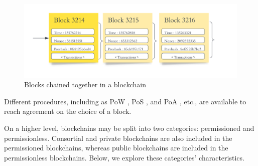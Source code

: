  \vspace{.5cm}
 
\begin{figure}[h]
  \includegraphics[width=\textwidth]{includes/figures/blocks.png}
  \caption{Blocks chained together in a blockchain}
  \label{Blocks chained together in a blockchain}
\end{figure}

 \vspace{.5cm}
 
Different procedures, including as \ac{PoW} \cite{pow}, \ac{PoS} \cite{pos}, and \ac{PoA} \cite{poa}, etc., are available to reach agreement on the choice of a block.
 
\vspace{.5cm}
 
On a higher level, blockchains may be split into two categories: permissioned and permissionless. Consortial and private blockchains are also included in the permissioned blockchains, whereas public blockchains are included in the permissionless blockchains. Below, we explore these categories' characteristics.

